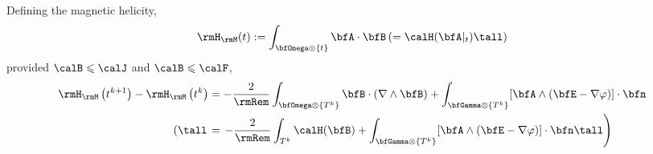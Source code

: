         \begin{theorem*}
            Defining the magnetic helicity,
            \begin{equation}
                \rmH_{\rmM}(t)  :=  \int_{\bfOmega\otimes\{t\}}\bfA\cdot\bfB  \left(=  \calH(\bfA|_{t})\tall\right)
            \end{equation}
            provided $\calB  \leqslant  \calJ$ and $\calB  \leqslant  \calF$,
            \begin{align}
                \rmH_{\rmM}\left(t^{k + 1}\right) - \rmH_{\rmM}\left(t^{k}\right)  &=  - \frac{2}{\rmRem}\int_{\bfOmega\otimes\left\{T^{k}\right\}}\bfB\cdot(\nabla\wedge\bfB) + \int_{\bfGamma\otimes\left\{T^{k}\right\}}[\bfA\wedge(\bfE - \nabla\varphi)]\cdot\bfn  \\
                \left(\tall\right.&=  \left.- \frac{2}{\rmRem}\int_{T^{k}}\calH(\bfB) + \int_{\bfGamma\otimes\left\{T^{k}\right\}}[\bfA\wedge(\bfE - \nabla\varphi)]\cdot\bfn\tall\right)
            \end{align}
        \end{theorem*}
